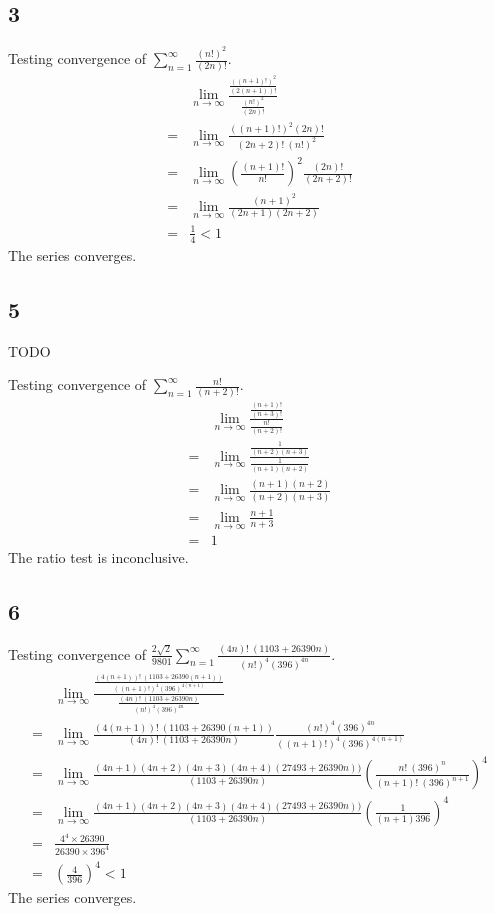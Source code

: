 \documentclass[12pt]{article}
\newcommand{\round}[1]{\left(       #1 \right)      }
\begin{document}
\subsection*{3}
Testing convergence of $\sum_{n=1}^\infty \frac{(n!)^2}{(2n)!}$.
\begin{align*}
     & \lim_{n\to\infty} \frac{\frac{((n+1)!)^2}{(2(n+1))!}}{\frac{(n!)^2}{(2n)!}} \\
    =& \lim_{n\to\infty} \frac{((n+1)!)^2 (2n)!}{(2n+2)!\ (n!)^2} \\
    =& \lim_{n\to\infty} \round{\frac{(n+1)!}{n!}}^2 \frac{(2n)!}{(2n+2)!} \\
    =& \lim_{n\to\infty} \frac{(n+1)^2}{(2n+1)(2n+2)} \\
    =& \frac{1}{4} < 1
\end{align*}
The series converges.



\subsection*{5}
TODO

Testing convergence of $\sum_{n=1}^\infty \frac{n!}{(n+2)!}$.
\begin{align*}
     & \lim_{n\to\infty} \frac{\frac{(n+1)!}{(n+3)!}}{\frac{n!}{(n+2)!}} \\
    =& \lim_{n\to\infty} \frac{\frac{1}{(n+2)(n+3)}}{\frac{1}{(n+1)(n+2)}} \\
    =& \lim_{n\to\infty} \frac{(n+1)(n+2)}{(n+2)(n+3)} \\
    =& \lim_{n\to\infty} \frac{n+1}{n+3} \\
    =& 1
\end{align*}
The ratio test is inconclusive.



\subsection*{6}
Testing convergence of $\frac{2\sqrt{2}}{9801} \sum_{n=1}^\infty \frac{(4n)!\ (1103+26390n)}{(n!)^4 (396)^{4n}}$.
\begin{align*}
     & \lim_{n\to\infty} \frac{\frac{(4(n+1))!\ (1103+26390(n+1))}{((n+1)!)^4 (396)^{4(n+1)}}} {\frac{(4n)!\ (1103+26390n)}{(n!)^4 (396)^{4n}}} \\
    =& \lim_{n\to\infty} \frac{(4(n+1))!\ (1103+26390(n+1))}{(4n)!\ (1103+26390n)} \frac{(n!)^4 (396)^{4n}}{((n+1)!)^4 (396)^{4(n+1)}} \\
    =& \lim_{n\to\infty} \frac{(4n+1)(4n+2)(4n+3)(4n+4) (27493+26390n))}{(1103+26390n)} \round{\frac{n!\ (396)^n}{(n+1)!\ (396)^{n+1}}}^4 \\
    =& \lim_{n\to\infty} \frac{(4n+1)(4n+2)(4n+3)(4n+4) (27493+26390n))}{(1103+26390n)} \round{\frac{1}{(n+1) 396}}^4 \\
    =& \frac{4^4 \times 26390}{26390 \times 396^4} \\
    =& \round{\frac{4}{396}}^4 < 1
\end{align*}
The series converges.
\end{document}
